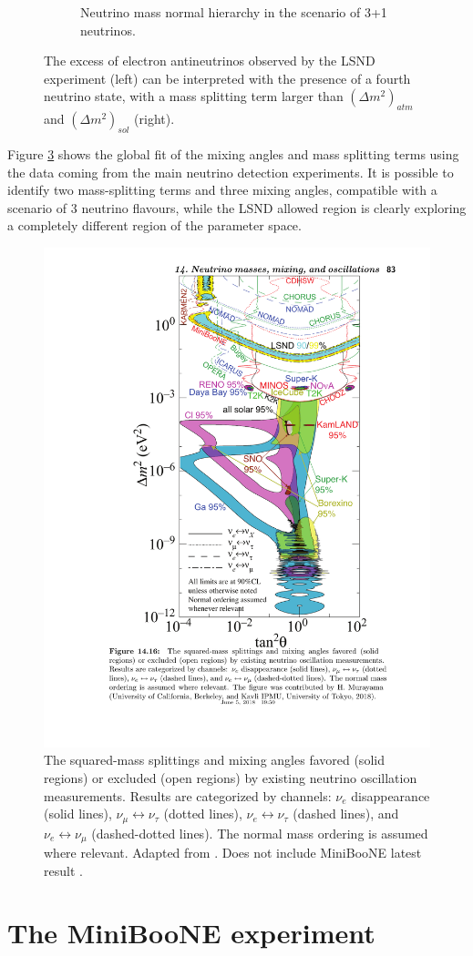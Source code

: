 \begin{figure}
\begin{subfigure}{0.45\textwidth}
\begin{center}
        \caption{Neutrino mass normal hierarchy in the scenario of 3+1 neutrinos.}\label{fig:masslsnd}
    \end{center}
  \end{subfigure}
    \caption{The excess of electron antineutrinos observed by the LSND experiment (left) can be interpreted with the presence of a fourth neutrino state, with a mass splitting term larger than $(\Delta m^2)_{atm}$ and $(\Delta m^2)_{sol}$ (right).}
\end{figure}

Figure \ref{fig:globalfit} shows the global fit of the mixing angles and mass splitting terms using the data coming from the main neutrino detection experiments. It is possible to identify two mass-splitting terms and three mixing angles, compatible with a scenario of 3 neutrino flavours, while the LSND allowed region is clearly exploring a completely different region of the parameter space. 

\begin{figure}[htbp]
    \centering
    \includegraphics[width=0.7\linewidth]{figures/globalfit.pdf}
    \caption{The squared-mass splittings and mixing angles favored (solid regions) or excluded (open regions) by existing neutrino oscillation measurements. Results are categorized by channels: $\nu_e$ disappearance (solid lines), $\nu_{\mu} \leftrightarrow \nu_{\tau}$  (dotted lines), $\nu_{e} \leftrightarrow \nu_{\tau}$ (dashed lines), and $\nu_{e} \leftrightarrow \nu_{\mu}$ (dashed-dotted lines). The normal mass ordering is assumed where relevant. Adapted from \cite{PhysRevD.98.030001}. Does not include MiniBooNE latest result \cite{Aguilar-Arevalo:2018gpe}.}
    \label{fig:globalfit}
\end{figure}

\section{The MiniBooNE experiment}